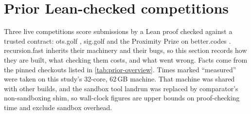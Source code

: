 \section{Prior Lean-checked competitions}\label{sec:prior}

Three live competitions score submissions by a Lean proof checked against a trusted
contract: ots.golf \cite{otsgolf2026}, sig.golf \cite{siggolf2026} and the Proximity Prize on
better.codes \cite{proximityprize2026}. recursion.fast inherits their machinery and their bugs, so
this section records how they are built, what checking them costs, and what went wrong. Facts come
from the pinned checkouts listed in \cref{tab:prior-overview}. Times marked ``measured'' were taken
on this study's 32-core, 62\,GB machine. That machine was shared with other builds, and the
sandbox tool landrun was replaced by comparator's non-sandboxing shim, so wall-clock figures are
upper bounds on proof-checking time and exclude sandbox overhead.

